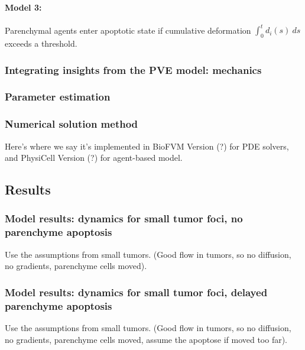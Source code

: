 \documentclass[smallextended,natbib,draft]{svjour3}
\begin{document}
\paragraph{Model 3:} Parenchymal agents enter apoptotic state if cumulative deformation 
$\int_0^t d_i(s)\: ds$ exceeds a threshold. 




\subsubsection{Integrating insights from the PVE model: mechanics}





\subsubsection{Parameter estimation}

\subsubsection{Numerical solution method} Here's where we say it's implemented in 
BioFVM Version (?) for PDE solvers, and PhysiCell Version (?) for agent-based model. 


\subsection{Results}

\subsubsection{Model results: dynamics for small tumor foci, no parenchyme apoptosis}
Use the assumptions from small tumors. (Good flow in tumors, so no diffusion, no gradients, parenchyme cells moved). 

\subsubsection{Model results: dynamics for small tumor foci, delayed parenchyme apoptosis} 
Use the assumptions from small tumors. (Good flow in tumors, so no diffusion, no gradients, parenchyme cells moved, 
assume the apoptose if moved too far). 
\end{document}
